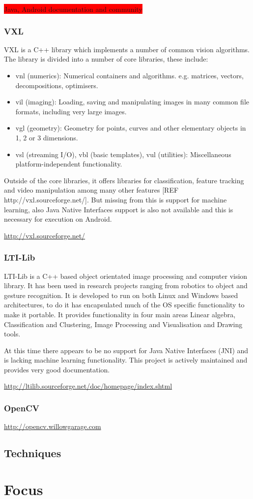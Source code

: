 \colorbox{red}{Java, Android documentation and community}

\subsubsection{VXL}
VXL is a C++ library which implements a number of common vision algorithms. The library is divided into a number of core libraries, these include: 

\begin{itemize}
\item vnl (numerics): Numerical containers and algorithms. e.g. matrices, vectors, decompositions, optimisers.
\item vil (imaging): Loading, saving and manipulating images in many common file formats, including very large images.
\item vgl (geometry): Geometry for points, curves and other elementary objects in 1, 2 or 3 dimensions.
\item vsl (streaming I/O), vbl (basic templates), vul (utilities): Miscellaneous platform-independent functionality.
\end{itemize}

Outside of the core libraries, it offers libraries for classification, feature tracking and video manipulation among many other features [REF http://vxl.sourceforge.net/]. But missing from this is support for machine learning, also Java Native Interfaces support is also not available and this is necessary for execution on Android.

\url{http://vxl.sourceforge.net/}


\subsubsection{LTI-Lib}
LTI-Lib is a C++ based object orientated image processing and computer vision library. It has been used in research projects ranging from robotics to object and gesture recognition. It is developed to run on both Linux and Windows based architectures, to do it has encapsulated much of the OS specific functionality to make it portable. It provides functionality in four main areas Linear algebra, Classification and Clustering, Image Processing and Visualisation and Drawing tools.

At this time there appears to be no support for Java Native Interfaces (JNI) and is lacking machine learning functionality. This project is actively maintained and provides very good documentation.
 
\url{http://ltilib.sourceforge.net/doc/homepage/index.shtml}


\subsubsection{OpenCV}
\url{http://opencv.willowgarage.com}

\subsection{Techniques}

\section{Focus}
